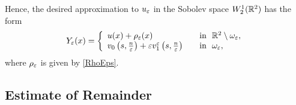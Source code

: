 Hence, the desired approximation to $u_\varepsilon$ in the Sobolev space $W_2^1(\mathbb R^2)$ has the form
\begin{equation}\label{AsymptoticsUe}
Y_\varepsilon(x)=
\left\{
  \begin{array}{ll}
    u(x)+\rho_\varepsilon(x)&\quad \hbox{in \ }\mathbb R^2\setminus \omega_\varepsilon, \\
    v_0\left(s,\textstyle\frac n{\varepsilon}\right)+\varepsilon v_1^\varepsilon\left(s,\textstyle\frac n{\varepsilon}\right)
&\quad \hbox{in \ } \omega_\varepsilon,
  \end{array}
\right.
\end{equation}
where $\rho_\varepsilon$ is given by \eqref{RhoEps}.







\subsection{Estimate of Remainder}

